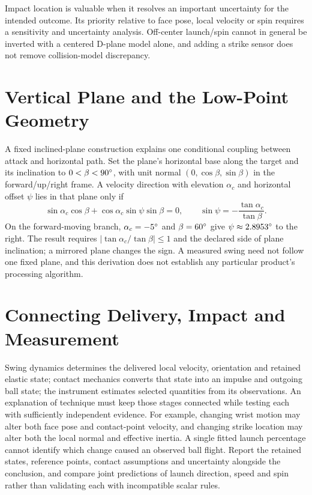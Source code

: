 \begin{implication}
Impact location is valuable when it resolves an important uncertainty for the intended outcome.
Its priority relative to face pose, local velocity or spin requires a sensitivity and uncertainty analysis.
Off-center launch/spin cannot in general be inverted with a centered D-plane model alone, and adding a strike sensor does not remove collision-model discrepancy.
\end{implication}

\section{Vertical Plane and the Low-Point Geometry}

A fixed inclined-plane construction explains one conditional coupling between attack and horizontal path.
Set the plane's horizontal base along the target and its inclination to $0<\beta<90\si{\degree}$, with unit normal $(0,\cos\beta,\sin\beta)$ in the forward/up/right frame.
A velocity direction with elevation $\alpha_c$ and horizontal offset $\psi$ lies in that plane only if
\begin{equation}
\label{eq:inclinedplanepath}
\sin\alpha_c\cos\beta+
 \cos\alpha_c\sin\psi\sin\beta=0,
\qquad
\sin\psi=-\frac{\tan\alpha_c}{\tan\beta}.
\end{equation}
On the forward-moving branch, $\alpha_c=-5\si{\degree}$ and $\beta=60\si{\degree}$ give $\psi\approx2.8953\si{\degree}$ to the right.
The result requires $|\tan\alpha_c/\tan\beta|\leq1$ and the declared side of plane inclination; a mirrored plane changes the sign.
A measured swing need not follow one fixed plane, and this derivation does not establish any particular product's processing algorithm.

\section{Connecting Delivery, Impact and Measurement}

Swing dynamics determines the delivered local velocity, orientation and retained elastic state; contact mechanics converts that state into an impulse and outgoing ball state; the instrument estimates selected quantities from its observations.
An explanation of technique must keep those stages connected while testing each with sufficiently independent evidence.
For example, changing wrist motion may alter both face pose and contact-point velocity, and changing strike location may alter both the local normal and effective inertia.
A single fitted launch percentage cannot identify which change caused an observed ball flight.
Report the retained states, reference points, contact assumptions and uncertainty alongside the conclusion, and compare joint predictions of launch direction, speed and spin rather than validating each with incompatible scalar rules.
